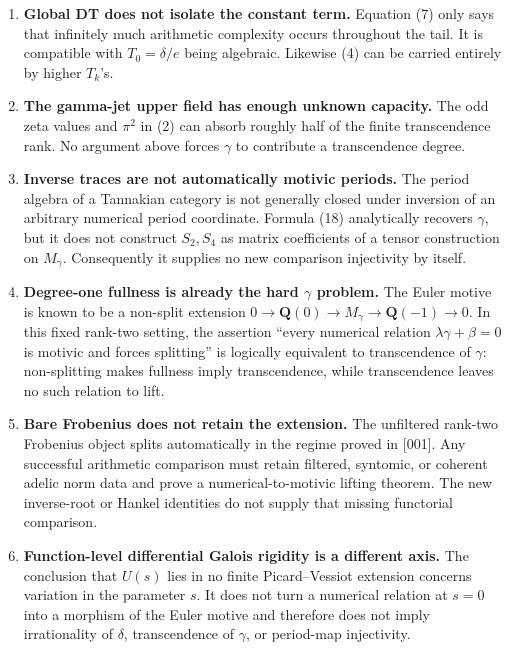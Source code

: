 \documentclass[11pt]{article}
\theoremstyle{keio}
\theoremstyle{definition}
\theoremstyle{remark}
\begin{document}
\begin{enumerate}
\def\labelenumi{\arabic{enumi}.}
\item
  \textbf{Global DT does not isolate the constant term.} Equation (7) only says
  that infinitely much arithmetic complexity occurs throughout the tail.
  It is compatible with \(T_0=\delta/e\) being algebraic. Likewise (4)
  can be carried entirely by higher \(T_k\)'s.
\item
  \textbf{The gamma-jet upper field has enough unknown capacity.} The odd
  zeta values and \(\pi^2\) in (2) can absorb roughly half of the finite
  transcendence rank. No argument above forces \(\gamma\) to contribute
  a transcendence degree.
\item
  \textbf{Inverse traces are not automatically motivic periods.} The period
  algebra of a Tannakian category is not generally closed under inversion
  of an arbitrary numerical period coordinate. Formula (18) analytically
  recovers \(\gamma\), but it does not construct \(S_2,S_4\) as matrix
  coefficients of a tensor construction on \(M_\gamma\). Consequently it
  supplies no new comparison injectivity by itself.
\item
  \textbf{Degree-one fullness is already the hard \(\gamma\) problem.} The
  Euler motive is known to be a non-split extension
  \(0\to\mathbf Q(0)\to M_\gamma\to\mathbf Q(-1)\to0\). In this fixed
  rank-two setting, the assertion ``every numerical relation
  \(\lambda\gamma+\beta=0\) is motivic and forces splitting'' is logically
  equivalent to transcendence of \(\gamma\): non-splitting makes fullness
  imply transcendence, while transcendence leaves no such relation to
  lift.
\item
  \textbf{Bare Frobenius does not retain the extension.} The unfiltered
  rank-two Frobenius object splits automatically in the regime proved in
  {[}001{]}. Any successful arithmetic comparison must retain filtered,
  syntomic, or coherent adelic norm data and prove a numerical-to-motivic
  lifting theorem. The new inverse-root or Hankel identities do not supply
  that missing functorial comparison.
\item
  \textbf{Function-level differential Galois rigidity is a different axis.}
  The conclusion that \(U(s)\) lies in no finite Picard--Vessiot extension
  concerns variation in the parameter \(s\). It does not turn a numerical
  relation at \(s=0\) into a morphism of the Euler motive and therefore does
  not imply irrationality of \(\delta\), transcendence of \(\gamma\), or
  period-map injectivity.
\end{enumerate}
\end{document}
